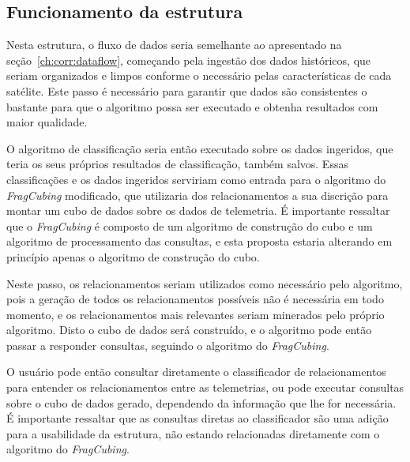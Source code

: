 {\subsection{Funcionamento da estrutura}\label{ch:prop:cube:func}

Nesta estrutura, o fluxo de dados seria semelhante ao apresentado na seção~\ref{ch:corr:dataflow}, começando pela ingestão dos dados históricos, que seriam organizados e limpos conforme o necessário pelas características de cada satélite.
Este passo é necessário para garantir que dados são consistentes o bastante para que o algoritmo possa ser executado e obtenha resultados com maior qualidade.

O algoritmo de classificação seria então executado sobre os dados ingeridos, que teria os seus próprios resultados de classificação, também salvos.
Essas classificações e os dados ingeridos serviriam como entrada para o algoritmo do \textit{FragCubing} modificado, que utilizaria dos relacionamentos a sua discrição para montar um cubo de dados sobre os dados de telemetria.
É importante ressaltar que o \textit{FragCubing} é composto de um algoritmo de construção do cubo e um algoritmo de processamento das consultas, e esta proposta estaria alterando em princípio apenas o algoritmo de construção do cubo.

Neste passo, os relacionamentos seriam utilizados como necessário pelo algoritmo, pois a geração de todos os relacionamentos possíveis não é necessária em todo momento, e os relacionamentos mais relevantes seriam minerados pelo próprio algoritmo.
Disto o cubo de dados será construído, e o algoritmo pode então passar a responder consultas, seguindo o algoritmo do \textit{FragCubing}.

O usuário pode então consultar diretamente o classificador de relacionamentos para entender os relacionamentos entre as telemetrias, ou pode executar consultas sobre o cubo de dados gerado, dependendo da informação que lhe for necessária.
É importante ressaltar que as consultas diretas ao classificador são uma adição para a usabilidade da estrutura, não estando relacionadas diretamente com o algoritmo do \textit{FragCubing}.

}
